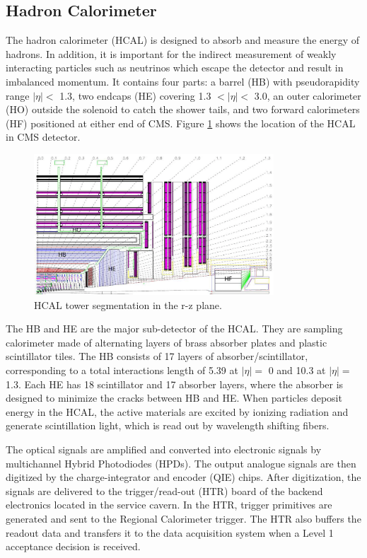 \documentclass[thesis.tex]{subfiles}
\begin{document}
\subsection{Hadron Calorimeter}
The hadron calorimeter (HCAL) is designed to absorb and measure the energy of hadrons. 
In addition, it is important for the indirect measurement of weakly interacting particles such as neutrinos which escape the detector and result in imbalanced momentum.
It contains four parts: a barrel (HB) with pseudorapidity range $|\eta| < $ 1.3, two endcaps (HE) covering 1.3 $ < |\eta| <$ 3.0, an outer calorimeter (HO) outside the solenoid to catch the shower tails, and two forward calorimeters (HF) positioned at either end of CMS.
Figure \ref{fig:hcal} shows the location of the HCAL in CMS detector. 

\begin{figure}[hbtp]
	\centering
	\includegraphics[width=0.8\textwidth]{plot/hcal.png}
	\caption{HCAL tower segmentation in the r-z plane.}
	\label{fig:hcal}
\end{figure}

The HB and HE are the major sub-detector of the HCAL. 
They are sampling calorimeter made of alternating layers of brass absorber plates and plastic scintillator tiles.
The HB consists of 17 layers of absorber/scintillator, corresponding to a total interactions length of 5.39 at $|\eta| =$ 0 and 10.3 at $|\eta| =$ 1.3.
Each HE has 18 scintillator and 17 absorber layers, where the absorber is designed to minimize the cracks between HB and HE. 
When particles deposit energy in the HCAL, the active materials are excited by ionizing radiation and generate scintillation light, which is read out by wavelength shifting fibers. 

The optical signals are amplified and converted into electronic signals by multichannel Hybrid Photodiodes (HPDs). 
The output analogue signals are then digitized by the charge-integrator and encoder (QIE) chips. 
After digitization, the signals are delivered to the trigger/read-out (HTR) board of the backend electronics located in the service cavern. 
In the HTR, trigger primitives are generated and sent to the Regional Calorimeter trigger.
The HTR also buffers the readout data and transfers it to the data acquisition system when a Level 1 acceptance decision is received.  
\end{document}
